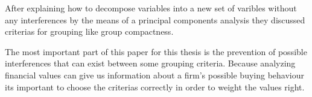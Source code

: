 After explaining how to decompose variables into a new set of varibles without any interferences by the means of a
principal components analysis they discussed criterias for grouping like group compactness.

The most important part of this paper for this thesis is the prevention of possible interferences that can exist between some grouping criteria.
Because analyzing financial values can give us information about a firm's possible buying behaviour its important to choose the
criterias correctly in order to weight the values right.
